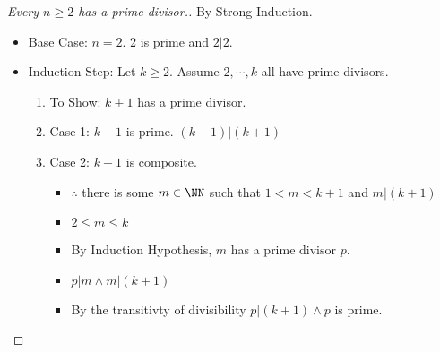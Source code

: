 \begin{proof}[Every $n \ge 2$ has a prime divisor.]
By Strong Induction.
\begin{itemize}
\item Base Case: $n=2$. 2 is prime and $2|2$. \ck
\item Induction Step: Let $k \ge 2$. Assume $2,\cdots,k$ all have prime divisors.
    \begin{enumerate}
        \item To Show: $k+1$ has a prime divisor.
        \item Case 1: $k+1$ is prime. $(k+1)|(k+1)$ \ck
        \item Case 2: $k+1$ is composite. 
        \begin{itemize}
            \item $\therefore$ there is some $m\in \NN$ such that $1<m<k+1$ and $m|(k+1)$
            \item $2 \le m \le k$
            \item By Induction Hypothesis, $m$ has a prime divisor $p$.
            \item $p|m \wedge m|(k+1)$
            \item By the transitivty of divisibility $p|(k+1) \wedge p$ is prime. \ck
        \end{itemize}
    \end{enumerate}
\end{itemize}
\end{proof}

